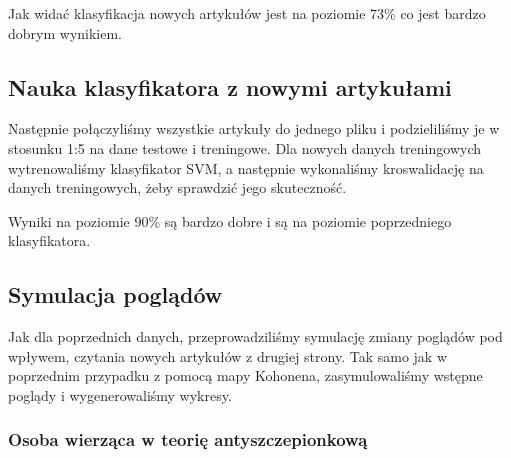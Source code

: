 \documentclass[11pt]{article}
\begin{document}
    \begin{center}
    \end{center}
    
    Jak widać klasyfikacja nowych artykułów jest na poziomie 73\% co jest bardzo dobrym wynikiem.


    \subsection*{Nauka klasyfikatora z nowymi artykułami}

    Następnie połączyliśmy wszystkie artykuły do jednego pliku i podzieliliśmy 
    je w stosunku 1:5 na dane testowe i treningowe.
    Dla nowych danych treningowych wytrenowaliśmy klasyfikator SVM, a następnie
    wykonaliśmy kroswalidację na danych treningowych, żeby sprawdzić jego skuteczność.
    
    \begin{center}
    \end{center}

    Wyniki na poziomie 90\% są bardzo dobre i są na poziomie poprzedniego klasyfikatora.

    \subsection*{Symulacja poglądów}

    Jak dla poprzednich danych, przeprowadziliśmy symulację zmiany poglądów pod wpływem,
    czytania nowych artykułów z drugiej strony.
    Tak samo jak w poprzednim przypadku z pomocą mapy Kohonena,
    zasymulowaliśmy wstępne poglądy i wygenerowaliśmy wykresy.


    \subsubsection*{Osoba wierząca w teorię antyszczepionkową}

    \begin{center}
    \end{center}
    { \hspace*{\fill} \\}
\end{document}
